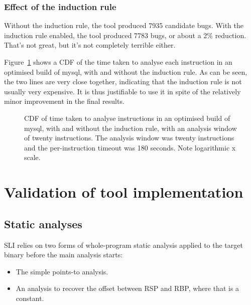 
\subsubsection{Effect of the induction rule}

Without the induction rule, the tool produced 7935 candidate bugs.
With the induction rule enabled, the tool produced 7783 bugs, or about
a 2\% reduction.  That's not great, but it's not completely terrible
either.

Figure~\ref{fig:eval:mysql:analysis_cdf} shows a CDF of the time taken
to analyse each instruction in an optimised build of mysql, with and
without the induction rule.  As can be seen, the two lines are very
close together, indicating that the induction rule is not usually very
expensive.  It is thus justifiable to use it in spite of the
relatively minor improvement in the final results.

\begin{figure}

\caption{CDF of time taken to analyse instructions in an optimised
  build of mysql, with and without the induction rule, with an
  analysis window of twenty instructions.  The analysis window was
  twenty instructions and the per-instruction timeout was 180 seconds.
  Note logarithmic x scale.} 
\label{fig:eval:mysql:analysis_cdf}
\end{figure}
  
\section{Validation of tool implementation}

\subsection{Static analyses}

SLI relies on two forms of whole-program static analysis applied to
the target binary before the main analysis starts:

\begin{itemize}
\item
  The simple points-to analysis.
\item
  An analysis to recover the offset between RSP and RBP, where that is a constant.
\end{itemize}

